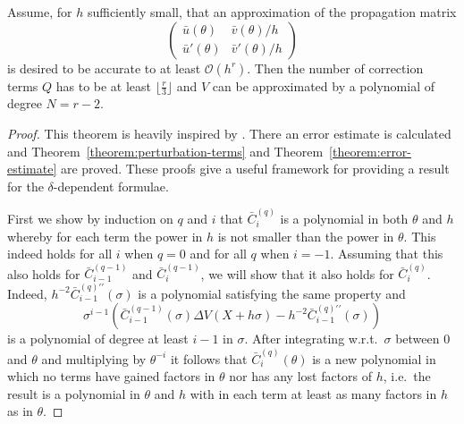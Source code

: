 \begin{theorem}\label{theorem:delta-formulae}
  Assume, for $h$ sufficiently small, that an approximation of the propagation matrix %
  $$
    \begin{pmatrix}
      \bar{u}(\theta)  & \bar{v}(\theta)/h  \\
      \bar{u}'(\theta) & \bar{v}'(\theta)/h
    \end{pmatrix}
  $$
  is desired to be accurate to at least $\mathcal{O}(h^r)$. %
  Then the number of correction terms $Q$ has to be at least $\lfloor\frac{r}{3} \rfloor$
  and $V$ can be approximated by a polynomial of degree $N=r-2$.

\end{theorem}
\begin{proof}
  This theorem is heavily inspired by \cite{ixaru_cp_1998}. There an error estimate is calculated and Theorem~\ref{theorem:perturbation-terms} and Theorem~\ref{theorem:error-estimate} are proved. These proofs give a useful framework for providing a result for the $\delta$-dependent formulae.


  First we show by induction on $q$ and $i$ that $\bar{C}_{i}^{(q)}$ is a polynomial in both $\theta$ and $h$ whereby for each term the power in $h$ is not smaller than the power in $\theta$. This indeed holds for all $i$ when $q=0$ and for all $q$ when $i=-1$.
  Assuming that this also holds for $\bar{C}_{i-1}^{(q-1)}$ and $\bar{C}_{i}^{(q-1)}$, we will show that it also holds for $\bar{C}_{i}^{(q)}$. Indeed,
  $h^{-2}\bar{C}_{i-1}^{(q)\prime\prime}(\sigma)$ is a polynomial satisfying the same property and
  $$
    \sigma^{i-1} \left(
    \bar{C}_{i-1}^{(q-1)}(\sigma) \Delta V(X+h\sigma) - h^{-2} \bar{C}_{i-1}^{(q)\prime\prime}(\sigma)
    \right)
  $$
  is a polynomial of degree at least $i-1$ in $\sigma$. After integrating w.r.t.\ $\sigma$ between $0$ and $\theta$ and multiplying by $\theta^{-i}$
  it follows that $\bar{C}_{i}^{(q)}(\theta)$ is a new polynomial in which no terms have gained factors in $\theta$ nor has any lost factors of $h$, i.e.\
  the result is a polynomial in $\theta$ and $h$ with in each term at least as many factors in $h$ as in $\theta$.


\end{proof}
